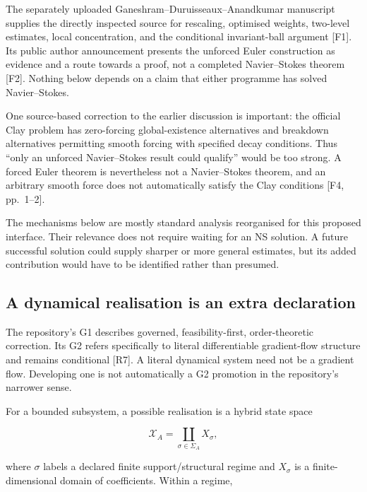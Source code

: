 \documentclass[11pt,a4paper]{article}
\begin{document}
The separately uploaded Ganeshram--Duruisseaux--Anandkumar manuscript
supplies the directly inspected source for rescaling, optimised weights,
two-level estimates, local concentration, and the conditional
invariant-ball argument {[}F1{]}. Its public author announcement
presents the unforced Euler construction as evidence and a route towards
a proof, not a completed Navier--Stokes theorem {[}F2{]}. Nothing below
depends on a claim that either programme has solved Navier--Stokes.

One source-based correction to the earlier discussion is important: the
official Clay problem has zero-forcing global-existence alternatives and
breakdown alternatives permitting smooth forcing with specified decay
conditions. Thus ``only an unforced Navier--Stokes result could
qualify'' would be too strong. A forced Euler theorem is nevertheless
not a Navier--Stokes theorem, and an arbitrary smooth force does not
automatically satisfy the Clay conditions {[}F4, pp.~1--2{]}.

The mechanisms below are mostly standard analysis reorganised for this
proposed interface. Their relevance does not require waiting for an NS
solution. A future successful solution could supply sharper or more
general estimates, but its added contribution would have to be
identified rather than presumed.

\subsection{A dynamical realisation is an extra
declaration}\label{a-dynamical-realisation-is-an-extra-declaration}

The repository's G1 describes governed, feasibility-first,
order-theoretic correction. Its G2 refers specifically to literal
differentiable gradient-flow structure and remains conditional {[}R7{]}.
A literal dynamical system need not be a gradient flow. Developing one
is not automatically a G2 promotion in the repository's narrower sense.

For a bounded subsystem, a possible realisation is a hybrid state space

\nopagebreak[4]

\[\mathscr X_A=\coprod_{\sigma\in\Sigma_A}X_\sigma,\]

where \(\sigma\) labels a declared finite support/structural regime and
\(X_\sigma\) is a finite-dimensional domain of coefficients. Within a
regime,

\nopagebreak[4]
\end{document}
